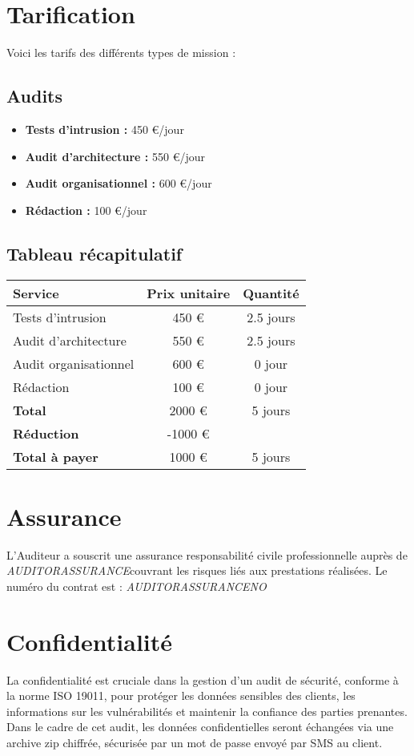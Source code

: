 \documentclass[12pt]{extarticle}
\begin{document}
\chapter{Tarification}
Voici les tarifs des différents types de mission :
\section{Audits}
\begin{itemize}
    \item \textbf{Tests d'intrusion :} 450 €/jour
    \item \textbf{Audit d'architecture :} 550 €/jour
    \item \textbf{Audit organisationnel :} 600 €/jour
    \item \textbf{Rédaction :} 100 €/jour
\end{itemize}
\section{Tableau récapitulatif}
\begin{center}
    \begin{tabular}{lcc}
        \toprule
        \textbf{Service} & \textbf{Prix unitaire} & \textbf{Quantité} \\
        \midrule
        Tests d'intrusion & 450 € & 2.5 jours \\
        Audit d'architecture & 550 € & 2.5 jours \\
        Audit organisationnel & 600 € & 0 jour \\
        Rédaction & 100 € & 0 jour \\
        \midrule
        \textbf{Total} & 2000 € & 5 jours \\
        \midrule
        \textbf{Réduction} & -1000 € &  \\
        \midrule
        \textbf{Total à payer} & 1000 € & 5 jours \\
        \bottomrule
    \end{tabular}
\end{center}
\newpage
\chapter{Assurance}
L'Auditeur a souscrit une assurance responsabilité civile professionnelle auprès de \textit{ {{AUDITORASSURANCE}}}couvrant les risques liés aux prestations réalisées.
Le numéro du contrat est : \textit{ {{AUDITORASSURANCENO}}}
\chapter{Confidentialité}
La confidentialité est cruciale dans la gestion d'un audit de sécurité, conforme à la norme ISO 19011, pour protéger les données sensibles des clients, les informations sur les vulnérabilités et maintenir la confiance des parties prenantes.
Dans le cadre de cet audit, les données confidentielles seront échangées via une archive zip chiffrée, sécurisée par un mot de passe envoyé par SMS au client.
\newpage
\end{document}
